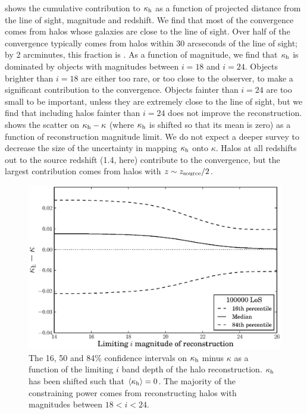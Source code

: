 \documentclass[useAMS,usenatbib]{mn2e}
\begin{document}
 shows the cumulative contribution to $\kappa_{\rm h}$ as a function
of projected distance from the line of sight, magnitude and redshift.
We find that most of the convergence comes from halos whose
galaxies are close to the line of sight. 
Over half of the  convergence
typically comes from halos within 30 arcseconds of the line of sight; by 2
arcminutes, this fraction is .
As a function of magnitude, we find
that $\kappa_{\rm h}$ is dominated by objects with magnitudes between $i=18$ and
$i=24$. Objects brighter than $i=18$ are either too rare, or too close to the
observer, to make a significant contribution to the convergence. Objects
fainter than $i=24$ are too small to be important, unless they are extremely
close to the line of sight, but we find that including halos fainter than
$i=24$ does not improve the reconstruction.   shows the
scatter on $\kappa_{\rm h}-\kappa$ (where $\kappa_{\rm h}$ is shifted so that its mean is
zero) as a function of reconstruction magnitude limit. 
%
%
%
We do
not expect a deeper survey to decrease the size of the uncertainty in mapping
$\kappa_{\rm h}$ onto $\kappa$. Halos at all redshifts out to the source redshift
(1.4, here) contribute to the convergence, but the largest contribution comes from
halos with $z \sim z_{\rm source}/2$.

\begin{figure}
\includegraphics[width=\columnwidth]{figs/mag_scatter.eps}
\caption[magcut]{The 16, 50 and 84\% confidence intervals on $\kappa_{\rm h}$ minus
$\kappa$ as a function of the limiting $i$ band depth of the halo
reconstruction. $\kappa_{\rm h}$ has been shifted such that
$\left\langle\kappa_{\rm h}\right\rangle=0$. The majority of the constraining power
comes from reconstructing halos with magnitudes between $18<i<24$.}
\label{fig:magcut}
\end{figure}
\end{document}
